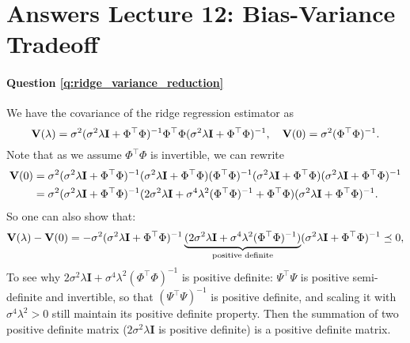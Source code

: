 \section{Answers Lecture 12: Bias-Variance Tradeoff}

\paragraph{Question \ref{q:ridge_variance_reduction}}
We have the covariance of the ridge regression estimator as
\begin{equation*}
\mathbf V(\lambda) = \sigma^2 (\sigma^2 \lambda \mathbf{I} + \Phi^\top \Phi )^{-1} \Phi^\top \Phi (\sigma^2 \lambda \mathbf{I} + \Phi^\top \Phi )^{-1}, \quad \mathbf V(0) = \sigma^2 ( \Phi^\top \Phi )^{-1}.
\end{equation*}
Note that as we assume $\Phi^\top \Phi$ is invertible, we can rewrite
\begin{equation*}
\begin{aligned}
\mathbf V(0) &= \sigma^2 (\sigma^2 \lambda \mathbf{I} + \Phi^\top \Phi )^{-1} (\sigma^2 \lambda \mathbf{I} + \Phi^\top \Phi ) ( \Phi^\top \Phi )^{-1} (\sigma^2 \lambda \mathbf{I} + \Phi^\top \Phi ) (\sigma^2 \lambda \mathbf{I} + \Phi^\top \Phi )^{-1} \\
&= \sigma^2 (\sigma^2 \lambda \mathbf{I} + \Phi^\top \Phi )^{-1} (2\sigma^2 \lambda \mathbf{I} + \sigma^4 \lambda^2 (\Phi^\top \Phi)^{-1} + \Phi^\top \Phi ) (\sigma^2 \lambda \mathbf{I} + \Phi^\top \Phi )^{-1}.
\end{aligned}
\end{equation*}
So one can also show that:
\begin{equation*}
\mathbf V(\lambda) - \mathbf V(0) =  -\sigma^2 (\sigma^2 \lambda \mathbf{I} + \Phi^\top \Phi )^{-1} \underbrace{(2\sigma^2 \lambda \mathbf{I} + \sigma^4 \lambda^2 (\Phi^\top \Phi)^{-1} )}_{\text{positive definite}} (\sigma^2 \lambda \mathbf{I} + \Phi^\top \Phi )^{-1} \preceq 0,
\end{equation*}
To see why $2\sigma^2 \lambda \mathbf{I} + \sigma^4 \lambda^2 (\Phi^\top \Phi)^{-1}$ is positive definite: $\Psi^\top \Psi$ is positive semi-definite and invertible, so that $(\Psi^\top \Psi)^{-1}$ is positive definite, and scaling it with $\sigma^4 \lambda^2 > 0$ still maintain its positive definite property. Then the summation of two positive definite matrix ($2 \sigma^2 \lambda \mathbf{I}$ is positive definite) is a positive definite matrix.

